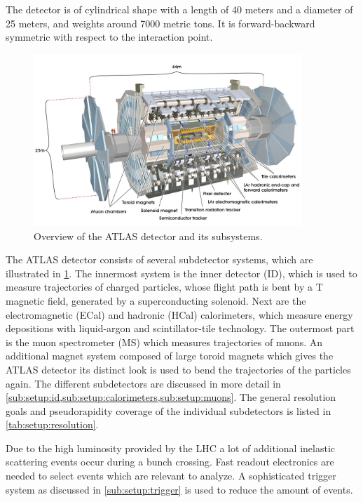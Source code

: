 The detector is of cylindrical shape with a length of 40 meters and a diameter of 25 meters, and weights around 7000 metric tons.
It is forward-backward symmetric with respect to the interaction point.

\begin{figure}[htb]
    \centering
    \includegraphics[width=0.9\textwidth]{./figures/setup/atlas.jpg}
    \caption{Overview of the ATLAS detector and its subsystems.~\cite{ImageATLAS}}\label{fig:setup:atlas}
\end{figure}

The ATLAS detector consists of several subdetector systems, which are illustrated in \cref{fig:setup:atlas}.
The innermost system is the inner detector (ID), which is used to measure trajectories
of charged particles, whose flight path is bent by a \unit[2]{T} magnetic field, generated by a superconducting solenoid.
Next are the electromagnetic (ECal) and hadronic (HCal) calorimeters, which measure energy depositions with
liquid-argon and scintillator-tile technology.
The outermost part is the muon spectrometer (MS) which measures trajectories of muons.
An additional magnet system composed of large toroid magnets which gives the ATLAS detector its distinct look is used
to bend the trajectories of the particles again.
The different subdetectors are discussed in more detail in
\cref{sub:setup:id,sub:setup:calorimeters,sub:setup:muons}.
The general resolution goals and pseudorapidity coverage of the individual subdetectors is listed in \cref{tab:setup:resolution}.

Due to the high luminosity provided by the LHC a lot of additional inelastic scattering events occur during
a bunch crossing.
Fast readout electronics are needed to select events which are relevant to analyze.
A sophisticated trigger system as discussed in \cref{sub:setup:trigger} is used to reduce the amount of events.

